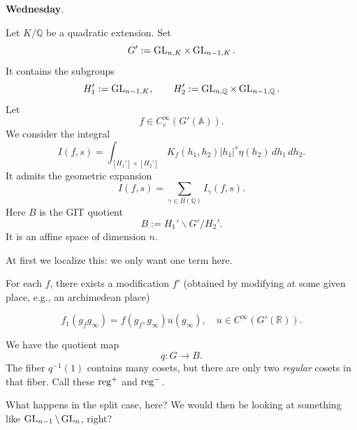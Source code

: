 \documentclass[reqno]{amsart} 
\begin{document}
\textbf{Wednesday}.

Let $K / \mathbb{Q}$ be a quadratic extension.  Set
\begin{equation*}
  G ' := \operatorname{GL}_{n, K} \times \operatorname{GL}_{n - 1, K}.
\end{equation*}
It contains the subgroups
\begin{equation*}
  H_1 ' := \operatorname{GL}_{n - 1, K}, \qquad H_2 ' := \operatorname{GL}_{n, \mathbb{Q}} \times \operatorname{GL}_{n - 1, \mathbb{Q}}.
\end{equation*}
Let
\begin{equation*}
  f \in C_c^\infty(G '(\mathbb{A})).
\end{equation*}
We consider the integral
\begin{equation*}
  I(f, s ) = \int_{[H_1 ' ] \times [H_2 ' ] } K_f(h_1, h_2 ) \lvert h_1  \rvert^s \eta(h_2 ) \, d h_1 \, d h_2.
\end{equation*}
It admits the geometric expansion
\begin{equation*}
  I(f, s) = \sum_{\gamma \in B(\mathbb{Q} )} I_\gamma(f , s).
\end{equation*}
Here $B$ is the GIT quotient
\begin{equation*}
  B := H_1 ' \backslash G ' / H_2 '.
\end{equation*}
It is an affine space of dimension $n$.

At first we localize this: we only want one term here.

For each $f$, there exists a modification $f'$ (obtained by modifying at some given place, e.g., an archimedean place)

\begin{equation*}
  f_1(g_f g _\infty) = f(g_f, g _\infty) u(g _\infty ), \quad u \in C^\infty(G '(\mathbb{R})).
\end{equation*}

We have the quotient map
\begin{equation*}
  q : G \rightarrow B.
\end{equation*}
The fiber $q^{-1}(1)$ contains many cosets, but there are only two \emph{regular} cosets in that fiber.  Call these $\operatorname{reg}^+$ and $\operatorname{reg}^-$.

\begin{remark}
  What happens in the split case, here?  We would then be looking at something like $\operatorname{GL}_{n-1} \backslash \operatorname{GL}_n$, right?
\end{remark}
\end{document}
